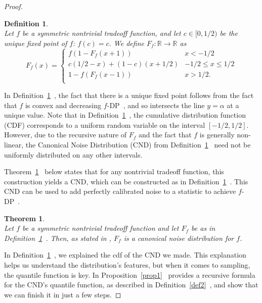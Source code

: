 \documentclass{article}
\newtheorem{thm}{Theorem}
\newtheorem{defn}{Definition}
\begin{document}
\begin{proof}
\begin{defn} \label{def1}  %
    \cite[Definition~3.7]{awan2023canonical} \\
    Let $f$ be a symmetric nontrivial tradeoff function, and let {$c\in [0,1/2)$} be the unique fixed point of $f$: $f(c)=c$. 
    We define $F_f:\mathbb{R}\rightarrow \mathbb{R}$ as  \[ F_f(x) = \begin{cases}
        f(1-F_f(x+1))&x<-1/2\\
        c(1/2-x) + (1-c)(x+1/2)&-1/2\leq x\leq 1/2\\
        1-f(F_f(x-1))&x>1/2.\\
    \end{cases}\]
\end{defn}
In Definition~\ref{def1}~\parencite{awan2023canonical}, 
the fact that there is a unique fixed point follows from the fact that $f$ is convex and decreasing $f$-DP~\parencite{dong2019gaussian}, 
and so intersects the line $y=\alpha$ at a unique value. 
Note that in Definition~\ref{def1}~\parencite{awan2023canonical}, 
the cumulative distribution function (CDF) corresponds to a uniform random variable on the interval $[-1/2,1/2]$. 
However, due to the recursive nature of $F_f$ and the fact that $f$ is generally non-linear, 
the Canonical Noise Distribution (CND) from Definition~\ref{def1}~\parencite{awan2023canonical} need not be uniformly distributed on any other intervals.

Theorem~\ref{thm1}~\parencite{awan2023canonical} below states that for any nontrivial tradeoff function, 
this construction yields a CND, which can be constructed as in Definition~\ref{def1}~\parencite{awan2023canonical}. 
This CND can be used to add perfectly calibrated noise to a statistic to achieve $f$-DP~\parencite[Proposition~2.2]{dong2019gaussian}. 

\begin{thm} \label{thm1}  %
    \cite[Theorem~3.9]{awan2023canonical} \\
    Let $f$ be a symmetric nontrivial tradeoff function and let $F_f$ be as in Definition~\ref{def1}~\parencite{awan2023canonical}. 
    Then, as stated in \parencite[Theorem~3.9]{awan2023canonical}, $F_f$ is a canonical noise distribution for $f$. 
\end{thm}

In Definition~\ref{def1}~\parencite{awan2023canonical}, we explained the cdf of the CND we made. 
This explanation helps us understand the distribution's features, but when it comes to sampling, the quantile function is key. 
In Proposition~\ref{prop1}~\parencite{awan2023canonical} provides a recursive formula for the CND's quantile function,
as described in Definition~\ref{def2}~\parencite{awan2023canonical}, and show that we can finish it in just a few steps.


\end{proof}
\end{document}
